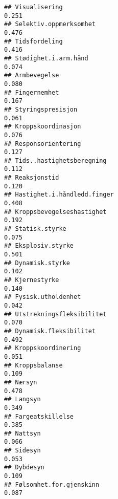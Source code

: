\documentclass[
]{article}
\begin{document}
\begin{verbatim}
## Visualisering                                                                    0.251
## Selektiv.oppmerksomhet                                                           0.476
## Tidsfordeling                                                                    0.416
## Stødighet.i.arm.hånd                                                             0.074
## Armbevegelse                                                                     0.080
## Fingernemhet                                                                     0.167
## Styringspresisjon                                                                0.061
## Kroppskoordinasjon                                                               0.076
## Responsorientering                                                               0.127
## Tids..hastighetsberegning                                                        0.112
## Reaksjonstid                                                                     0.120
## Hastighet.i.håndledd.finger                                                      0.408
## Kroppsbevegelseshastighet                                                        0.192
## Statisk.styrke                                                                   0.075
## Eksplosiv.styrke                                                                 0.501
## Dynamisk.styrke                                                                  0.102
## Kjernestyrke                                                                     0.140
## Fysisk.utholdenhet                                                               0.042
## Utstrekningsfleksibilitet                                                        0.070
## Dynamisk.fleksibilitet                                                           0.492
## Kroppskoordinering                                                               0.051
## Kroppsbalanse                                                                    0.109
## Nærsyn                                                                           0.478
## Langsyn                                                                          0.349
## Fargeatskillelse                                                                 0.385
## Nattsyn                                                                          0.066
## Sidesyn                                                                          0.053
## Dybdesyn                                                                         0.109
## Følsomhet.for.gjenskinn                                                          0.087

\end{verbatim}
\end{document}
